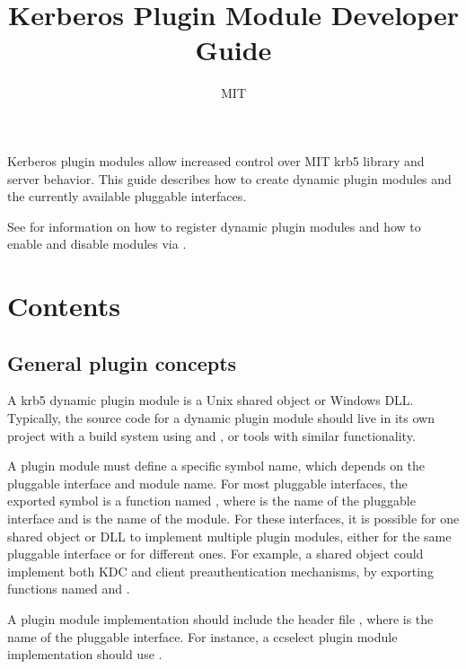\documentclass[letterpaper,10pt,english]{sphinxmanual}
\title{Kerberos Plugin Module Developer Guide}
\date{ }
\author{MIT}
\begin{document}
\maketitle
\sphinxtableofcontents
{}\label{\detokenize{plugindev/index::doc}}


Kerberos plugin modules allow increased control over MIT krb5 library
and server behavior.  This guide describes how to create dynamic
plugin modules and the currently available pluggable interfaces.

See  for information on how to register dynamic
plugin modules and how to enable and disable modules via
.


\chapter{Contents}
\label{\detokenize{plugindev/index:for-plugin-module-developers}}\label{\detokenize{plugindev/index:contents}}

\section{General plugin concepts}
\label{\detokenize{plugindev/general:general-plugin-concepts}}\label{\detokenize{plugindev/general::doc}}
A krb5 dynamic plugin module is a Unix shared object or Windows DLL.
Typically, the source code for a dynamic plugin module should live in
its own project with a build system using  and , or
tools with similar functionality.

A plugin module must define a specific symbol name, which depends on
the pluggable interface and module name.  For most pluggable
interfaces, the exported symbol is a function named
, where  is the name of the
pluggable interface and  is the name of the module.  For these
interfaces, it is possible for one shared object or DLL to implement
multiple plugin modules, either for the same pluggable interface or
for different ones.  For example, a shared object could implement both
KDC and client preauthentication mechanisms, by exporting functions
named  and .

A plugin module implementation should include the header file
, where  is the name of the
pluggable interface.  For instance, a ccselect plugin module
implementation should use .
\end{document}
